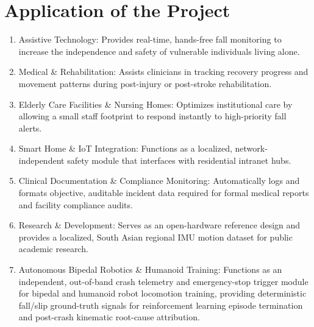 \section{Application of the Project}
\begin{enumerate}

\item Assistive Technology: Provides real-time, hands-free fall monitoring to increase the independence and safety of vulnerable individuals living alone.

\item Medical \& Rehabilitation: Assists clinicians in tracking recovery progress and movement patterns during post-injury or post-stroke rehabilitation.

\item Elderly Care Facilities \& Nursing Homes: Optimizes institutional care by allowing a small staff footprint to respond instantly to high-priority fall alerts.

\item Smart Home \& IoT Integration: Functions as a localized, network-independent safety module that interfaces with residential intranet hubs.

\item Clinical Documentation \& Compliance Monitoring: Automatically logs and formats objective, auditable incident data required for formal medical reports and facility compliance audits.

\item Research \& Development: Serves as an open-hardware reference design and provides a localized, South Asian regional IMU motion dataset for public academic research.

\item Autonomous Bipedal Robotics \& Humanoid Training: Functions as an independent, out-of-band crash telemetry and emergency-stop trigger module for bipedal and humanoid robot locomotion training, providing deterministic fall/slip ground-truth signals for reinforcement learning episode termination and post-crash kinematic root-cause attribution.
\end{enumerate}